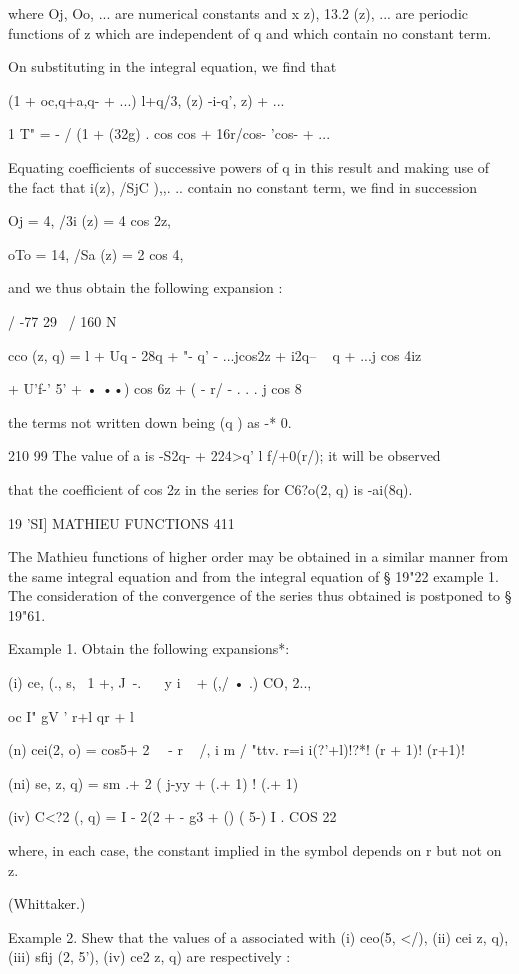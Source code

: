 where Oj, Oo, ... are numerical constants and x z), 13.2 (z), ... are
periodic functions of z which are independent of q and which contain
no constant term.

On substituting in the integral equation, we find that

(1 + oc,q+a,q- + ...) l+q/3, (z) -i-q', z) + ...

1 T" = - / (1 + \/(32g) . cos cos + 16r/cos- 'cos- + ...

Equating coefficients of successive powers of q in this result and
making use of the fact that i(z), /SjC ),,. .. contain no constant
term, we find in succession

Oj = 4, /3i (z) = 4 cos 2z,

oTo = 14, /Sa (z) = 2 cos 4,

and we thus obtain the following expansion :

/ -77 29 \ / 160 N

cco (z, q) = l + Uq - 28q + "- q' - ...jcos2z + i2q-- ~ q + ...j cos
4iz

+ U'f-' 5' + • ••) cos 6z + ( - r/ - . . . j cos 8

the terms not written down being (q ) as -* 0.

210 99 The value of a is -S2q- + 224>q' l f/+0(r/); it will be
observed

that the coefficient of cos 2z in the series for C6?o(2, q) is
-ai(8q).

19 'SI] MATHIEU FUNCTIONS 411

The Mathieu functions of higher order may be obtained in a similar
manner from the same integral equation and from the integral equation
of § 19"22 example 1. The consideration of the convergence of the
series thus obtained is postponed to § 19"61.

Example 1. Obtain the following expansions*:

(i) ce, (., s, \ 1 +, J\ -. ~ \ y i ~ + (,/ • .) CO, 2..,

oc I" gV ' r+l qr + l

(n) cei(2, o) = cos5+ 2 \ \ - r ~ /, i m / "ttv. r=i i(?'+l)!?*! (r +
1)! (r+1)!

(ni) se, z, q) = sm .+ 2 ( j-yy + (.+ 1) ! (.+ 1)

(iv) C<?2 (, q) = I - 2(2 + - g3 + () ( 5-) I . COS 22

where, in each case, the constant implied in the symbol depends on r
but not on z.

(Whittaker.)

Example 2. Shew that the values of a associated with (i) ceo(5, </),
(ii) cei z, q), (iii) sfij (2, 5'), (iv) ce2 z, q) are respectively :

